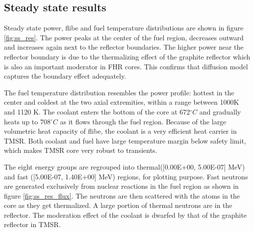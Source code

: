 \documentclass{elsarticle}
\begin{document}
\subsection{Steady state results}

Steady state power, flibe and fuel temperature distributions are shown in figure \ref{fig:ss_res}. 
The power peaks at the center of the fuel region, decreases outward and increases again next to the reflector boundaries. The higher power near the reflector boundary is due to the thermalizing effect of the graphite reflector which is also an important moderator in FHR cores. This confirms that diffusion model captures the boundary effect adequately. 

The fuel temperature distribution resembles the power profile: hottest in the center and coldest at the two axial extremities, within a range between 1000K and 1120 K. 
The coolant enters the bottom of the core at 672$^{\circ}C$ and gradually heats up to 708$^{\circ}C$ as it flows through the fuel region.
Because of the large volumetric heat capacity of flibe, the coolant is a very efficient heat carrier in TMSR. Both coolant and fuel have large temperature margin below safety limit, which makes TMSR core very robust to transients.

The eight energy groups are regrouped into thermal([0.00E+00, 5.00E-07] MeV) and fast ([5.00E-07, 1.40E+00] MeV) regions, for plotting purpose. Fast neutrons are generated exclusively from nuclear reactions in the fuel region as shown in figure \ref{fig:ss_res_flux}. The neutrons are then scattered with the atoms in the core as they get thermalized. A large portion of thermal neutrons are in the reflector. The moderation effect of the coolant is dwarfed by that of the graphite reflector in TMSR. 
\end{document}

